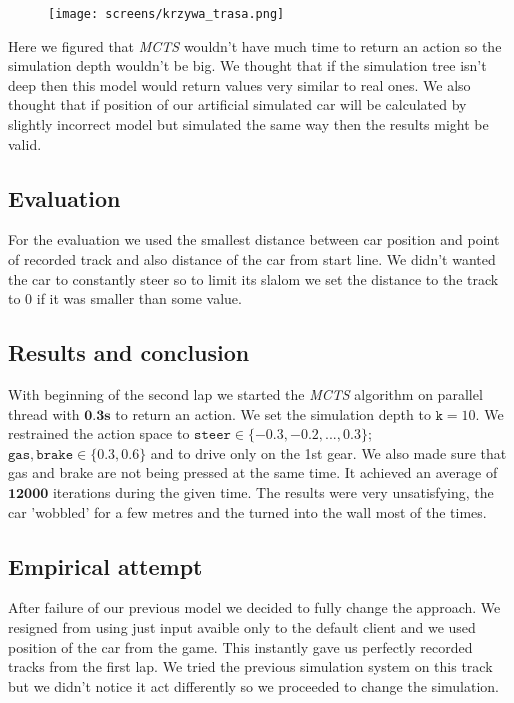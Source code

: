\documentclass[11pt]{article}
\begin{document}
	\begin{figure}[H]
 	    \centering
    		\texttt{[image: screens/krzywa\_trasa.png]}
 	\end{figure}
	
	Here we figured that \textit{MCTS} wouldn't have much time to return an action so the simulation depth wouldn't be big. We thought that if the simulation tree isn't deep then this model would return values very similar to real ones. We also thought that if position of our artificial simulated car will be calculated by slightly incorrect model but simulated the same way then the results might be valid.
	
	\subsection*{Evaluation}
	For the evaluation we used the smallest distance between car position and point of recorded track and also distance of the car from start line. We didn't wanted the car to constantly steer so to limit its slalom we set the distance to the track to $0$ if it was smaller than some value.
	
	\subsection*{Results and conclusion}
	With beginning of the second lap we started the \textit{MCTS} algorithm on parallel thread with $\textbf{0.3s}$ to return an action. We set the simulation depth to $\texttt{k} = 10$. We restrained the action space to $\texttt{steer}\in \{-0.3, -0.2, ..., 0.3\}$; $\texttt{gas}, \texttt{brake} \in \{0.3, 0.6\}$ and to drive only on the 1st gear. We also made sure that gas and brake are not being pressed at the same time. It achieved an average of $\textbf{12000}$ iterations during the given time. The results were very unsatisfying, the car 'wobbled' for a few metres and the turned into the wall most of the times.

    \subsection{Empirical attempt}
    After failure of our previous model we decided to fully change the approach. We resigned from using just input avaible only to the default client and we used position of the car from the game. This instantly gave us perfectly recorded tracks from the first lap. We tried the previous simulation system on this track but we didn't notice it act differently so we proceeded to change the simulation.
\end{document}
